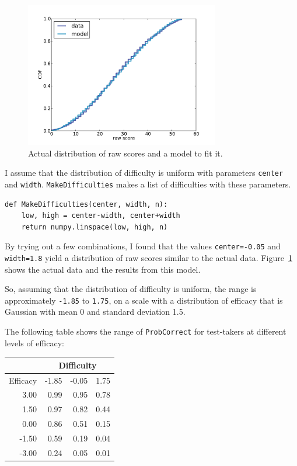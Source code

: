 \documentclass[12pt]{book}
\begin{document}
\begin{figure}
\centerline{\includegraphics[height=2.5in]{figs/sat_calibrate.pdf}}
\caption{Actual distribution of raw scores and a model to fit it.}
\label{fig.satcalibrate}
\end{figure}

I assume that the distribution of difficulty is uniform with
parameters {\tt center} and {\tt width}.  {\tt MakeDifficulties}
makes a list of difficulties with these parameters.

\begin{verbatim}
def MakeDifficulties(center, width, n):
    low, high = center-width, center+width
    return numpy.linspace(low, high, n)
\end{verbatim}

By trying out a few combinations, I found that
the values {\tt center=-0.05} and {\tt width=1.8} yield a distribution
of raw scores similar to the actual data.
Figure~\ref{fig.satcalibrate} shows the actual data and the results
from this model.

So, assuming that the distribution of difficulty is uniform,
the range is approximately
{\tt -1.85} to {\tt 1.75}, on a scale with a distribution of
efficacy that is Gaussian with mean 0 and standard deviation 1.5.

The following table shows the range of {\tt ProbCorrect} for
test-takers at different levels of efficacy:

\begin{tabular}{|r|r|r|r|}
\hline
           & \multicolumn{3}{|c|}{Difficulty} \\
\hline
Efficacy   & -1.85   &   -0.05   &      1.75  \\
\hline
3.00 &  0.99 &  0.95 &  0.78   \\
1.50 &  0.97 &  0.82 &  0.44   \\
0.00 &  0.86 &  0.51 &  0.15   \\
-1.50 &  0.59 &  0.19 &  0.04   \\
-3.00 &  0.24 &  0.05 &  0.01   \\
\hline
\end{tabular}
\end{document}

